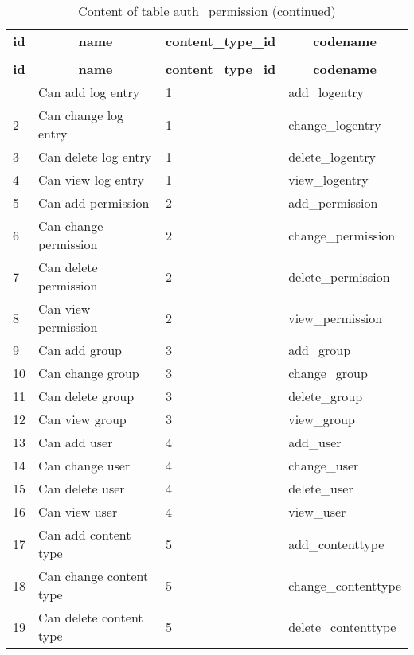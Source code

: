 %
%
 \begin{longtable}{|l|l|l|l|} 
 \hline \endhead \hline \endfoot \hline 
 \caption{Content of table auth\_permission} \label{tab:auth_permission-data} \\\hline \multicolumn{1}{|c|}{\textbf{id}} & \multicolumn{1}{|c|}{\textbf{name}} & \multicolumn{1}{|c|}{\textbf{content\_type\_id}} & \multicolumn{1}{|c|}{\textbf{codename}} \\ \hline \hline  \endfirsthead 
\caption{Content of table auth\_permission (continued)} \\ \hline \multicolumn{1}{|c|}{\textbf{id}} & \multicolumn{1}{|c|}{\textbf{name}} & \multicolumn{1}{|c|}{\textbf{content\_type\_id}} & \multicolumn{1}{|c|}{\textbf{codename}} \\ \hline \hline \endhead \endfoot
1 & Can add log entry & 1 & add\_logentry \\ \hline 
2 & Can change log entry & 1 & change\_logentry \\ \hline 
3 & Can delete log entry & 1 & delete\_logentry \\ \hline 
4 & Can view log entry & 1 & view\_logentry \\ \hline 
5 & Can add permission & 2 & add\_permission \\ \hline 
6 & Can change permission & 2 & change\_permission \\ \hline 
7 & Can delete permission & 2 & delete\_permission \\ \hline 
8 & Can view permission & 2 & view\_permission \\ \hline 
9 & Can add group & 3 & add\_group \\ \hline 
10 & Can change group & 3 & change\_group \\ \hline 
11 & Can delete group & 3 & delete\_group \\ \hline 
12 & Can view group & 3 & view\_group \\ \hline 
13 & Can add user & 4 & add\_user \\ \hline 
14 & Can change user & 4 & change\_user \\ \hline 
15 & Can delete user & 4 & delete\_user \\ \hline 
16 & Can view user & 4 & view\_user \\ \hline 
17 & Can add content type & 5 & add\_contenttype \\ \hline 
18 & Can change content type & 5 & change\_contenttype \\ \hline 
19 & Can delete content type & 5 & delete\_contenttype \\ \hline 

\end{longtable}
